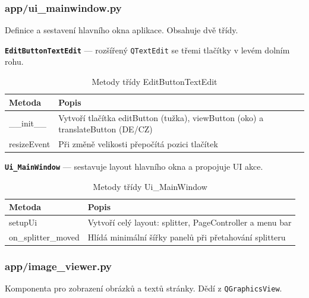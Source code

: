 \documentclass[FM,Proj]{tulthesis}
\begin{document}
\subsubsection{app/ui\_mainwindow.py}

Definice a sestavení hlavního okna aplikace. Obsahuje dvě třídy.

\textbf{\texttt{EditButtonTextEdit}} — rozšířený \texttt{QTextEdit} se třemi tlačítky
v levém dolním rohu.

\begin{table}[H]
	\centering
	\caption{Metody třídy EditButtonTextEdit}
	\begin{tabularx}{\textwidth}{|l|X|}
		\hline
		\textbf{Metoda} & \textbf{Popis} \\ \hline
		\_\_init\_\_   & Vytvoří tlačítka editButton (tužka), viewButton (oko) a translateButton (DE/CZ) \\ \hline
		resizeEvent    & Při změně velikosti přepočítá pozici tlačítek \\ \hline
	\end{tabularx}
	\label{tab:editbuttontextedit}
\end{table}

\textbf{\texttt{Ui\_MainWindow}} — sestavuje layout hlavního okna a propojuje UI akce.

\begin{table}[H]
	\centering
	\caption{Metody třídy Ui\_MainWindow}
	\begin{tabularx}{\textwidth}{|l|X|}
		\hline
		\textbf{Metoda} & \textbf{Popis} \\ \hline
		setupUi             & Vytvoří celý layout: splitter, PageController a menu bar \\ \hline
		on\_splitter\_moved & Hlídá minimální šířky panelů při přetahování splitteru \\ \hline
	\end{tabularx}
	\label{tab:uimainwindow}
\end{table}

\subsubsection{app/image\_viewer.py}

Komponenta pro zobrazení obrázků a textů stránky. Dědí z \texttt{QGraphicsView}.
\end{document}
